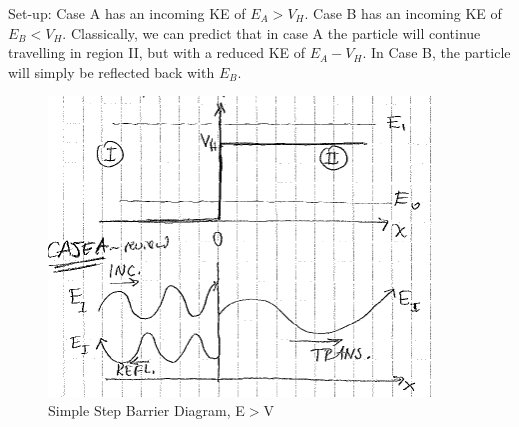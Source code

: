 \documentclass{school-22.101-notes}
\begin{document}
Set-up: Case A has an incoming KE of $E_A > V_H$. Case B has an incoming KE of $E_B < V_H$. Classically, we can predict that in case A the particle will continue travelling in region II, but with a reduced KE of $E_A - V_H$. In Case B, the particle will simply be reflected back with $E_B$. 

\begin{figure}[h!]
    \centering
    \includegraphics[width=4in]{images/qm/step-barrier-caseA.png}
    \caption{Simple Step Barrier Diagram, E$>$V}
\end{figure}
\end{document}
